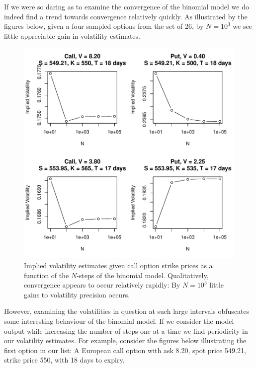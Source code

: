 \documentclass[12pt]{article}
\newlength\tindent
\renewcommand{\indent}{\hspace*{\tindent}}
\begin{document}
\indent If we were so daring as to examine the convergence of the binomial model we do indeed find a trend towards convergence relatively quickly. As illustrated by the figures below, given a four sampled options from the set of 26, by $N = 10^3$ we see little appreciable gain in volatility estimates. 

\begin{figure}[H]
	\centering
 	\includegraphics[scale=0.75]{../plots/imp_vol_conv_N.pdf}
\caption{\footnotesize Implied volatility estimates given call option strike prices as a function of the $N$-steps of the binomial model. Qualitatively, convergence appears to occur relatively rapidly: By $N = 10^3$ little gains to volatility precision occurs. }
\end{figure}

\indent However, examining the volatilities in question at such large intervals obfuscates some interesting behaviour of the binomial model. If we consider the model output while increasing the number of steps one at a time we find periodicity in our volatility estimates. For example, consider the figures below illustrating the first option in our list: A European call option with ask 8.20, spot price 549.21, strike price 550, with 18 days to expiry.
\end{document}
